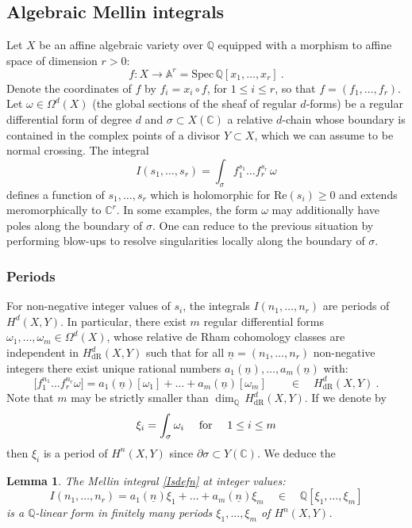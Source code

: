 \documentclass[a4paper,10pt]{amsart}
\newtheorem{lem}[thm]{Lemma}
\theoremstyle{definition}
\theoremstyle{remark}
\numberwithin{equation}{section}
\newcommand{\To}{\longrightarrow}
\newcommand{\Q}{\mathbb Q}
\newcommand{\C}{\mathbb C}
\newcommand{\dR}{\mathrm{dR}}
\newcommand{\0}{\color{blue}{\mathsf{0}}}
\begin{document}
\subsection{Algebraic Mellin integrals} \label{sect: setup} 
Let $X$ be an affine  algebraic variety over $\Q$ equipped with a morphism to affine space of dimension $r>0$:
\begin{equation}\label{geom: mapf}  f: X \To \mathbb{A}^r= \mathrm{Spec} \, \Q[ x_1,\ldots, x_r] \ . 
\end{equation} 
Denote the coordinates  of $f$ by  $f_i = x_i \circ f$, for $1 \leq i \leq r$, so that  $f= (f_1,\ldots, f_r)$.
Let $\omega \in \Omega^d(X)$ (the global sections of the sheaf of regular $d$-forms)  be a regular differential form of degree $d$ and 
$\sigma \subset  X(\C)$   a relative $d$-chain whose boundary is contained in the complex points of a  divisor $Y \subset X$, which we can assume to be normal crossing. The integral
\begin{equation} \label{Isdefn}  I(s_1,\ldots, s_r) = \int_{\sigma}  f_1^{s_1} \ldots f_r^{s_r} \,\omega \end{equation}
defines a function of $s_1,\ldots, s_r$ which is holomorphic for $\mathrm{Re}(s_i)\geq 0$  and extends meromorphically to $\C^{r}$.  In some examples, the form $\omega$ may additionally have poles along the boundary of $\sigma$. One can reduce to the previous situation by performing blow-ups to resolve singularities locally  along the boundary of $\sigma$. 



\subsubsection{Periods} \label{sect: periods} 
For non-negative integer values of $s_i$, the integrals $I(n_1,\ldots, n_r)$ are periods of $H^d(X,Y)$. In particular, there exist $m$  regular differential forms $\omega_1,\ldots, \omega_m\in \Omega^d(X)$,   whose relative de Rham cohomology classes are independent in $H_{\dR}^d(X,Y)$ such that for all $\underline{n}= (n_1,\ldots, n_r)$  non-negative integers there exist unique rational numbers $a_{1}(\underline{n}), \ldots, a_{m}(\underline{n})$  with:
\begin{equation} \label{ai(n)defn}   {[}f_1^{n_1} \ldots f_r^{n_r} \omega ] = a_{1}(\underline{n})  [\omega_1] + \ldots + a_m(\underline{n}) [\omega_m]  \qquad \in\quad  H_{\mathrm{dR}}^d(X,Y) \ .
\end{equation} 
Note that $m$ may be strictly smaller than $\dim_{\Q} \, H^d_{\mathrm{dR}}(X,Y)$.  If we denote by 
\[ \xi_i = \int_{\sigma} \omega_i \quad  \hbox{ for } \quad 1\leq i\leq m\]
then  $\xi_i$ is a period  of $H^n(X,Y)$ since   $\partial \sigma \subset Y(\C)$. We deduce the 
 \begin{lem} \label{lem: periodsxi} The Mellin integral \eqref{Isdefn} at integer values: 
\[  I(n_1,\ldots, n_r) =  a_{1}(\underline{n})  \xi_1 + \ldots + a_m(\underline{n}) \xi_m \quad \in \quad  \Q[\xi_1,\ldots, \xi_m] \]
is a $\Q$-linear form in finitely many periods $\xi_1,\ldots, \xi_m$ of $H^n(X,Y)$.
\end{lem} 
\end{document}
